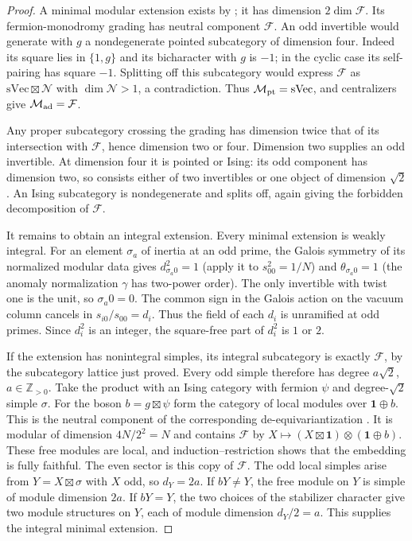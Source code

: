 \documentclass[11pt,a4paper]{article}
\numberwithin{equation}{section}
\newcommand{\one}{\mathbf1}
\begin{document}
\begin{proof}
A minimal modular extension exists by
\cite[Corollary~1.3]{JFR}; it has dimension $2\dim\mathcal F$.
Its fermion-monodromy grading has neutral component $\mathcal F$.
An odd invertible would generate with $g$ a nondegenerate pointed
subcategory of dimension four. Indeed its square lies in
$\{1,g\}$ and its bicharacter with $g$ is $-1$; in the cyclic
case its self-pairing has square $-1$. Splitting off this subcategory
would express $\mathcal F$ as
$\mathrm{sVec}\boxtimes\mathcal N$ with $\dim\mathcal N>1$, a
contradiction. Thus $\mathcal M_{\rm pt}=\mathrm{sVec}$, and
centralizers give $\mathcal M_{\rm ad}=\mathcal F$.

Any proper subcategory crossing the grading has dimension twice
that of its intersection with $\mathcal F$, hence dimension two or
four. Dimension two supplies an odd invertible. At dimension four
it is pointed or Ising: its odd component has dimension two, so
consists either of two invertibles or one object of dimension
$\sqrt2$. An Ising subcategory is nondegenerate and splits off,
again giving the forbidden decomposition of $\mathcal F$.

It remains to obtain an integral extension. Every minimal extension is
weakly integral. For an element $\sigma_a$ of inertia at an odd prime,
the Galois symmetry of its normalized modular data
\cite[Theorem~II]{DLNCongruence} gives
$d_{\sigma_a 0}^2=1$ (apply it to $s_{00}^2=1/N$)
and $\theta_{\sigma_a 0}=1$ (the anomaly normalization $\gamma$
has two-power order). The only invertible with twist one is the unit,
so $\sigma_a0=0$. The common sign in the Galois action on the vacuum
column cancels in $s_{i0}/s_{00}=d_i$. Thus the field of each $d_i$
is unramified at odd primes. Since $d_i^2$ is an integer, the
square-free part of $d_i^2$ is $1$ or $2$.

If the extension has nonintegral simples, its integral subcategory
is exactly $\mathcal F$, by the subcategory lattice just proved.
Every odd simple therefore has degree $a\sqrt2$, $a\in\mathbb Z_{>0}$.
Take the product with an Ising category with fermion $\psi$ and
degree-$\sqrt2$ simple $\sigma$. For the boson $b=g\boxtimes\psi$
form the category of local modules over $\one\oplus b$. This is the
neutral component of the corresponding de-equivariantization
\cite[Proposition~4.56(i),(ii)]{DGNO}. It is modular of dimension $4N/2^2=N$ and contains $\mathcal F$
by $X\mapsto (X\boxtimes\one)\otimes(\one\oplus b)$.
These free modules are local, and induction--restriction shows
that the embedding is fully faithful. The even sector is this
copy of $\mathcal F$. The odd local simples arise from
$Y=X\boxtimes\sigma$ with $X$ odd, so $d_Y=2a$. If $bY\ne Y$,
the free module on $Y$ is simple of module dimension $2a$.
If $bY=Y$, the two choices of the stabilizer character give
two module structures on $Y$, each of module dimension $d_Y/2=a$.
This supplies the integral minimal extension.


\end{proof}
\end{document}
